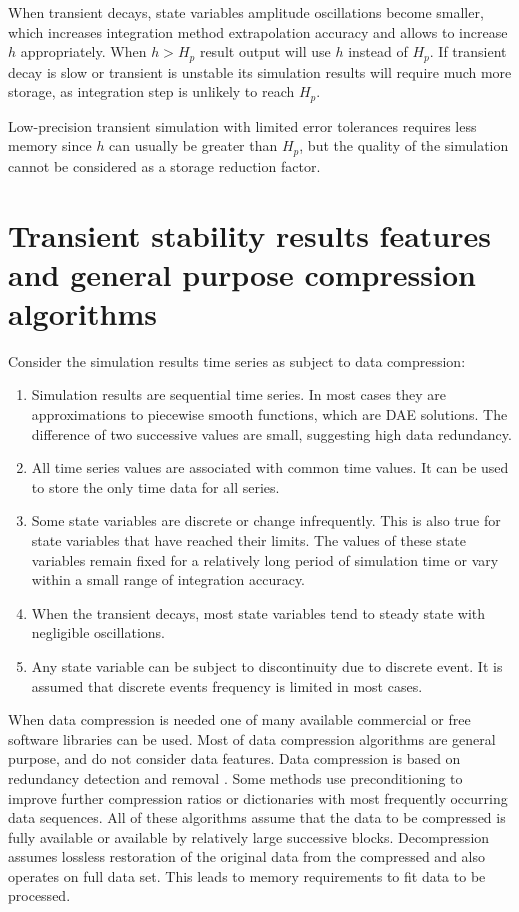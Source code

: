 \documentclass[lettersize,journal]{IEEEtran}
\begin{document}
When transient decays, state variables amplitude oscillations become smaller, which increases
integration method extrapolation accuracy and allows to increase \(h\) appropriately.
When \(h>H_p\) result output will use \(h\) instead of \(H_p\). If transient decay is slow or
transient is unstable its simulation results will require much more storage, as integration
step is unlikely to reach \(H_p\). 

Low-precision transient simulation with limited error tolerances requires less memory since \(h\) can usually be
greater than \(H_p\), but the quality of the simulation cannot be considered as a storage reduction factor.

\section{Transient stability results features and general purpose compression algorithms}
Consider the simulation results time series as subject to data compression:

\begin{enumerate}
	\item{Simulation results are sequential time series. In most cases they are approximations
	to piecewise smooth functions, which are DAE solutions. The difference of two successive
	values are small, suggesting high data redundancy.}
	\item{All time series values are associated with common time values. It can be used to store the only time data for all series.}
	\item{Some state variables are discrete or change infrequently. This is also true for state variables that have reached their limits. The values of these state variables remain fixed for a relatively long period of simulation time or vary within a small range of integration accuracy.}
	\item{When the transient decays, most state variables tend to steady state with negligible oscillations.}
	\item{Any state variable can be subject to discontinuity due to discrete event. It is assumed that discrete events frequency is limited in most cases. }
\end{enumerate}

When data compression is needed one of many available commercial or free software libraries can be used.
Most of data compression algorithms are general purpose, and do not consider data features.
Data compression is based on redundancy detection and removal \cite{lzw77,welch84}. 
Some methods use preconditioning to improve further compression ratios \cite{bwt94} or dictionaries 
with most frequently occurring data sequences.  All of these algorithms assume that the data to be compressed is
fully available or available by relatively large successive blocks. Decompression assumes 
lossless restoration of the original data from the compressed and also operates on full data set. 
This leads to memory requirements to fit data to be processed.
\end{document}
